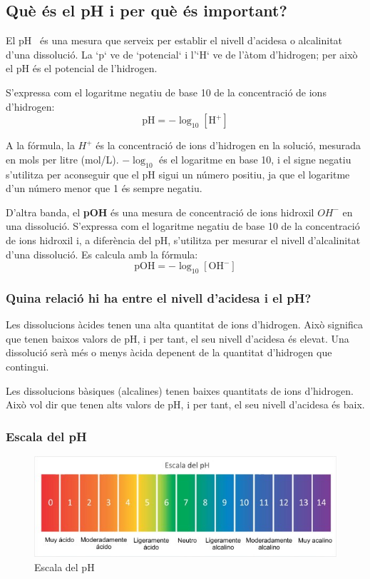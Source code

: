 \subsection{Què és el pH i per què és important?}
El pH~\cite{PH} és una mesura que serveix per establir el nivell d’acidesa o alcalinitat d'una dissolució. La `p` ve de `potencial` i l'`H` ve de l’àtom d’hidrogen; per això el pH és el potencial de l’hidrogen.
%

S'expressa com el logaritme negatiu de base 10 de la concentració de ions d'hidrogen:
$$ \text{pH} = -\log_{10} [\mathrm{H}^+] $$

A la fórmula, la ${H}^+$ és la concentració de ions d'hidrogen en la solució, mesurada en mols per litre (mol/L). $-\log_{10}$ és el logaritme en base 10, i el signe negatiu s'utilitza per aconseguir que el pH sigui un número positiu, ja que el logaritme d'un número menor que 1 és sempre negatiu.

D'altra banda, el \textbf{pOH} és una mesura de concentració de ions hidroxil ${OH}^-$ en una dissolució. S'expressa com el logaritme negatiu de base 10 de la concentració de ions hidroxil i, a diferència del pH, s'utilitza per mesurar el nivell d’alcalinitat d'una dissolució. Es calcula amb la fórmula:
$$ \text{pOH} = -\log_{10} [\mathrm{OH}^-] $$

\subsubsection{Quina relació hi ha entre el nivell d'acidesa i el pH?}
Les dissolucions àcides tenen una alta quantitat de ions d'hidrogen. Això significa que tenen baixos valors de pH, i per tant, el seu nivell d'acidesa és elevat. Una dissolució serà més o menys àcida depenent de la quantitat d'hidrogen que contingui.%


Les dissolucions bàsiques (alcalines) tenen baixes quantitats de ions d'hidrogen. Això vol dir que tenen alts valors de pH, i per tant, el seu nivell d'acidesa és baix.

\subsubsection{Escala del pH}
\begin{figure}[h!]
\centering
\includegraphics[width=1\textwidth]{./Figures/EscaladepH.png}
\caption{Escala del pH~\cite{PH}}
\label{fig:escaladeph}
\end{figure}

